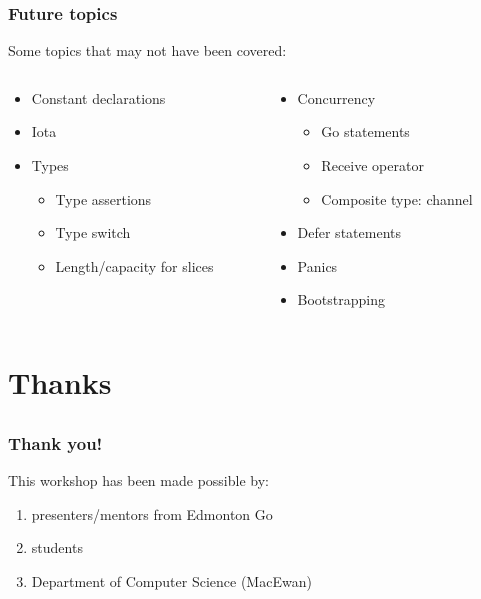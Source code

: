 \begin{frame}[t]
  \frametitle{Future topics}

  Some topics that may not have been covered:

  \begin{columns}[T]
    \begin{column}{0.5\linewidth}
      \begin{itemize}
      \item Constant declarations
      \item Iota
      \item Types
        
        \begin{itemize}
        \item Type assertions
        \item Type switch
        \item Length/capacity for slices
        \end{itemize}
      \end{itemize}
    \end{column}
    \begin{column}{0.5\linewidth}
      \begin{itemize}
      \item Concurrency
        
        \begin{itemize}
        \item Go statements
        \item Receive operator
        \item Composite type: channel
        \end{itemize}
      \item Defer statements
      \item Panics
      \item Bootstrapping
      \end{itemize}
    \end{column}
  \end{columns}
\end{frame}

\section{Thanks}
\subsection*{}

\begin{frame}[t]
  \frametitle{Thank you!}

  This workshop has been made possible by:
  \begin{enumerate}
  \item presenters/mentors from Edmonton Go
  \item students
  \item Department of Computer Science (MacEwan)
  \end{enumerate}
\end{frame}


